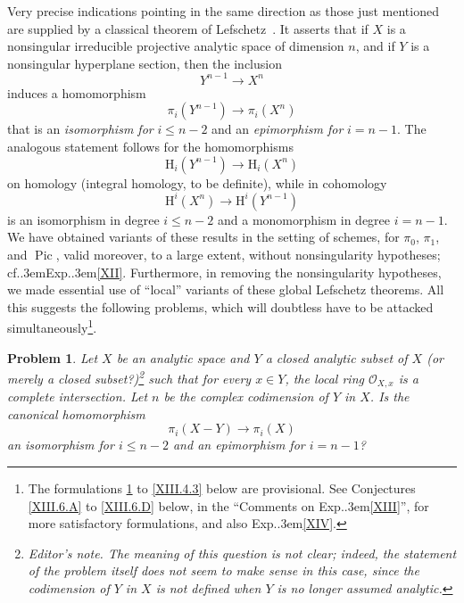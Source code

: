 \documentclass[11pt,a4paper,oneside]{book}
\providecommand{\sisi}[2]{#2}
\providecommand{\pageoriginale}{%
  \refstepcounter{pageoriginal}%
  \marginpar{\raggedright\footnotesize\bfseries\thepageoriginal}%
  \xspace}
\providecommand{\nde}[1]{\footnote{\textit{Editor's note.} #1}}
\providecommand{\sfootnote}[1]{\footnote{#1}}
\providecommand{\og}{``}
\providecommand{\fg}{''\xspace}
\providecommand{\cf}{cf.\kern.3em}
\providecommand{\Exp}{Exp.\kern.3em}
\providecommand{\OXx}{\mathcal O_{X,x}}
\providecommand{\Pic}{\operatorname{Pic}}
\renewcommand{\H}{\mathrm H}
\theoremstyle{plain}
\newtheorem{probleme}[subsection]{Problem}
\theoremstyle{definition}
\theoremstyle{remark}
\renewcommand{\Ref}[1]{\textup{\ref{#1}}}
\begin{document}
Very precise indications pointing in the same direction as those just
mentioned are supplied by a classical theorem of
\sisi{LEFSCHETZ}{Lefschetz}~\cite{XIII.7}. It asserts that if $X$ is a
nonsingular irreducible projective analytic space of dimension $n$, and
if $Y$ is a nonsingular hyperplane section, then the inclusion
$$
Y^{n-1}\to X^n
$$
induces\pageoriginale a homomorphism
$$
\pi_i(Y^{n-1})\to \pi_i(X^n)
$$
that is an \emph{isomorphism for} $i\leq n-2$ and an
\emph{epimorphism for} $i=n-1$. The analogous statement follows for the
homomorphisms
$$
\H_i(Y^{n-1})\to \H_i(X^n)
$$
on homology (integral homology, to be definite), while in cohomology
$$
\H^i(X^n)\to\H^i(Y^{n-1})
$$
is an isomorphism in degree $i\leq n-2$ and a monomorphism in degree
$i=n-1$. We have obtained variants of these results in the setting of
schemes, for $\pi_0$, $\pi_1$, and $\Pic$, valid moreover, to a large
extent, without nonsingularity hypotheses; \cf \Exp \Ref{XII}.
Furthermore, in removing the nonsingularity hypotheses, we made
essential use of \og local\fg variants of these global Lefschetz
theorems. All this suggests the following problems, which will doubtless
have to be attacked simultaneously\sfootnote{The formulations
\Ref{XIII.4.1} to \Ref{XIII.4.3} below are provisional. See Conjectures
\ref{XIII.6.A} to \ref{XIII.6.D} below, in the \og Comments on
\Exp \Ref{XIII}\fg, for more satisfactory formulations, and also
\Exp \Ref{XIV}.}.

\begin{probleme} \label{XIII.4.1}
Let $X$ be an analytic space and $Y$ a closed analytic subset of $X$
(or merely a closed subset?)\nde{The meaning of this question is not
clear; indeed, the statement of the problem itself does not seem to make
sense in this case, since the codimension of $Y$ in $X$ is not defined
when $Y$ is no longer assumed analytic.} such that for every $x\in Y$,
the local ring $\OXx$ is a complete intersection. Let $n$ be the complex
codimension of $Y$ in $X$. Is the canonical homomorphism
$$
\pi_i(X-Y)\to \pi_i(X)
$$
an isomorphism for $i\leq n-2$ and an epimorphism for $i=n-1$?
\end{probleme}
\end{document}
